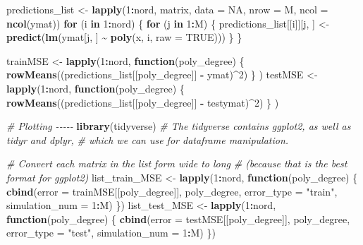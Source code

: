 \documentclass[
]{article}
\newenvironment{Shaded}{\begin{snugshade}}{\end{snugshade}}
\newcommand{\AttributeTok}[1]{\textcolor[rgb]{0.13,0.29,0.53}{#1}}
\newcommand{\CommentTok}[1]{\textcolor[rgb]{0.56,0.35,0.01}{\textit{#1}}}
\newcommand{\ConstantTok}[1]{\textcolor[rgb]{0.56,0.35,0.01}{#1}}
\newcommand{\ControlFlowTok}[1]{\textcolor[rgb]{0.13,0.29,0.53}{\textbf{#1}}}
\newcommand{\DecValTok}[1]{\textcolor[rgb]{0.00,0.00,0.81}{#1}}
\newcommand{\FunctionTok}[1]{\textcolor[rgb]{0.13,0.29,0.53}{\textbf{#1}}}
\newcommand{\NormalTok}[1]{#1}
\newcommand{\OtherTok}[1]{\textcolor[rgb]{0.56,0.35,0.01}{#1}}
\newcommand{\SpecialCharTok}[1]{\textcolor[rgb]{0.81,0.36,0.00}{\textbf{#1}}}
\newcommand{\StringTok}[1]{\textcolor[rgb]{0.31,0.60,0.02}{#1}}
\begin{document}
\begin{Shaded}
\begin{Highlighting}[]
\NormalTok{predictions\_list }\OtherTok{\textless{}{-}} \FunctionTok{lapply}\NormalTok{(}\DecValTok{1}\SpecialCharTok{:}\NormalTok{nord, matrix, }\AttributeTok{data =} \ConstantTok{NA}\NormalTok{, }\AttributeTok{nrow =}\NormalTok{ M, }\AttributeTok{ncol =} \FunctionTok{ncol}\NormalTok{(ymat))}
\ControlFlowTok{for}\NormalTok{ (i }\ControlFlowTok{in} \DecValTok{1}\SpecialCharTok{:}\NormalTok{nord) \{}
  \ControlFlowTok{for}\NormalTok{ (j }\ControlFlowTok{in} \DecValTok{1}\SpecialCharTok{:}\NormalTok{M) \{}
\NormalTok{    predictions\_list[[i]][j, ] }\OtherTok{\textless{}{-}} \FunctionTok{predict}\NormalTok{(}\FunctionTok{lm}\NormalTok{(ymat[j, ] }\SpecialCharTok{\textasciitilde{}} \FunctionTok{poly}\NormalTok{(x, i, }\AttributeTok{raw =} \ConstantTok{TRUE}\NormalTok{)))}
\NormalTok{  \}}
\NormalTok{\}}

\NormalTok{trainMSE }\OtherTok{\textless{}{-}} \FunctionTok{lapply}\NormalTok{(}\DecValTok{1}\SpecialCharTok{:}\NormalTok{nord, }
                   \ControlFlowTok{function}\NormalTok{(poly\_degree) \{}
                     \FunctionTok{rowMeans}\NormalTok{((predictions\_list[[poly\_degree]] }\SpecialCharTok{{-}}\NormalTok{ ymat)}\SpecialCharTok{\^{}}\DecValTok{2}\NormalTok{)}
\NormalTok{                   \}}
\NormalTok{)}
\NormalTok{testMSE }\OtherTok{\textless{}{-}} \FunctionTok{lapply}\NormalTok{(}\DecValTok{1}\SpecialCharTok{:}\NormalTok{nord, }
                  \ControlFlowTok{function}\NormalTok{(poly\_degree) \{}
                    \FunctionTok{rowMeans}\NormalTok{((predictions\_list[[poly\_degree]] }\SpecialCharTok{{-}}\NormalTok{ testymat)}\SpecialCharTok{\^{}}\DecValTok{2}\NormalTok{)}
\NormalTok{                  \}}
\NormalTok{)}

\CommentTok{\# Plotting {-}{-}{-}{-}{-}}
\FunctionTok{library}\NormalTok{(tidyverse) }\CommentTok{\# The tidyverse contains ggplot2, as well as tidyr and dplyr, }
\CommentTok{\# which we can use for dataframe manipulation.}

\CommentTok{\# Convert each matrix in the list form wide to long }
\CommentTok{\# (because that is the best format for ggplot2)}
\NormalTok{list\_train\_MSE }\OtherTok{\textless{}{-}} \FunctionTok{lapply}\NormalTok{(}\DecValTok{1}\SpecialCharTok{:}\NormalTok{nord, }\ControlFlowTok{function}\NormalTok{(poly\_degree) \{}
  \FunctionTok{cbind}\NormalTok{(}\AttributeTok{error =}\NormalTok{ trainMSE[[poly\_degree]], }
\NormalTok{        poly\_degree, }
        \AttributeTok{error\_type =} \StringTok{"train"}\NormalTok{,}
        \AttributeTok{simulation\_num =} \DecValTok{1}\SpecialCharTok{:}\NormalTok{M)}
\NormalTok{\})}
\NormalTok{list\_test\_MSE }\OtherTok{\textless{}{-}} \FunctionTok{lapply}\NormalTok{(}\DecValTok{1}\SpecialCharTok{:}\NormalTok{nord, }\ControlFlowTok{function}\NormalTok{(poly\_degree) \{}
  \FunctionTok{cbind}\NormalTok{(}\AttributeTok{error =}\NormalTok{ testMSE[[poly\_degree]], }
\NormalTok{        poly\_degree, }
        \AttributeTok{error\_type =} \StringTok{"test"}\NormalTok{, }
        \AttributeTok{simulation\_num =} \DecValTok{1}\SpecialCharTok{:}\NormalTok{M)}
\NormalTok{\})}


\end{Highlighting}
\end{Shaded}
\end{document}
